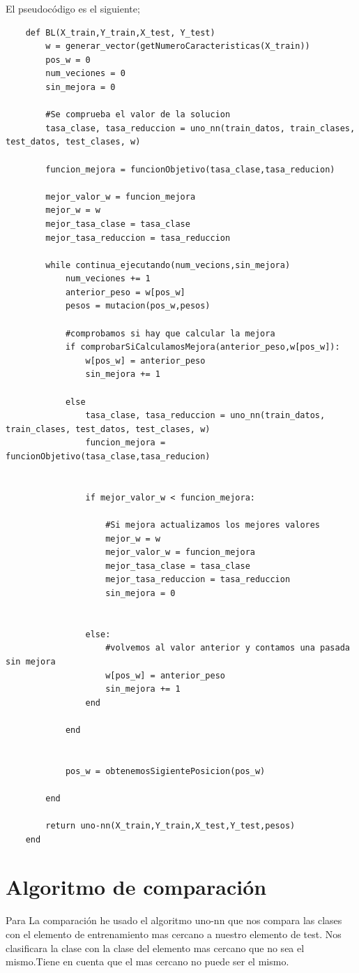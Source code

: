 \documentclass[titlepage]{article}
\begin{document}
	El pseudocódigo es el siguiente;
	\newpage
	\begin{lstlisting}
	def BL(X_train,Y_train,X_test, Y_test)
		w = generar_vector(getNumeroCaracteristicas(X_train))
		pos_w = 0
		num_veciones = 0
		sin_mejora = 0
		
		#Se comprueba el valor de la solucion
		tasa_clase, tasa_reduccion = uno_nn(train_datos, train_clases, test_datos, test_clases, w)
		
		funcion_mejora = funcionObjetivo(tasa_clase,tasa_reducion)
		
		mejor_valor_w = funcion_mejora
		mejor_w = w
		mejor_tasa_clase = tasa_clase
		mejor_tasa_reduccion = tasa_reduccion
		
		while continua_ejecutando(num_vecions,sin_mejora)
			num_veciones += 1
			anterior_peso = w[pos_w]
			pesos = mutacion(pos_w,pesos)
			
			#comprobamos si hay que calcular la mejora
			if comprobarSiCalculamosMejora(anterior_peso,w[pos_w]):
				w[pos_w] = anterior_peso
				sin_mejora += 1	
				
			else
				tasa_clase, tasa_reduccion = uno_nn(train_datos, train_clases, test_datos, test_clases, w)            
				funcion_mejora = funcionObjetivo(tasa_clase,tasa_reducion)
				
				
				if mejor_valor_w < funcion_mejora:
					
					#Si mejora actualizamos los mejores valores
					mejor_w = w
					mejor_valor_w = funcion_mejora
					mejor_tasa_clase = tasa_clase
					mejor_tasa_reduccion = tasa_reduccion
					sin_mejora = 0
				
				
				else:
					#volvemos al valor anterior y contamos una pasada sin mejora
					w[pos_w] = anterior_peso
					sin_mejora += 1
				end
			
			end
			
			
			pos_w = obtenemosSigientePosicion(pos_w)
		
		end
		
		return uno-nn(X_train,Y_train,X_test,Y_test,pesos)
	end
	\end{lstlisting}
	
	\section{Algoritmo de comparación}
	Para La comparación he usado el algoritmo uno-nn que nos compara las clases con el elemento de entrenamiento mas cercano a nuestro elemento de test. Nos clasificara la clase con la clase del elemento mas cercano que no sea el mismo.Tiene en cuenta que el mas cercano no puede ser el mismo.
	
\end{document}
